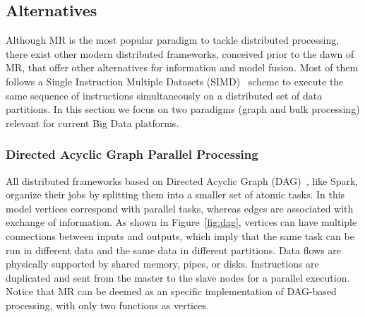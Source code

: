 \documentclass[3p,review]{elsarticle}
\begin{document}


\subsection{Alternatives}\label{subsec:altMR}

Although MR is the most popular paradigm to tackle distributed processing, there exist other modern distributed frameworks, conceived prior to the dawn of MR, that offer other alternatives for information and model fusion. Most of them follows a Single Instruction Multiple Datasets (SIMD)~\cite{sung00} scheme to execute the same sequence of instructions simultaneously on a distributed set of data partitions. In this section we focus on two paradigms (graph and bulk processing) relevant for current Big Data platforms.

\subsubsection{Directed Acyclic Graph Parallel Processing}

All distributed frameworks based on Directed Acyclic Graph (DAG)~\cite{dennis74}, like Spark, organize their jobs by splitting them into a smaller set of atomic tasks. In this model vertices correspond with parallel tasks, whereas edges are associated with exchange of information. As shown in Figure~\ref{fig:dag}, vertices can have multiple connections between inputs and outputs, which imply that the same task can be run in different data and the same data in different partitions. Data flows are physically supported by shared memory, pipes, or disks. Instructions are duplicated and sent from the master to the slave nodes for a parallel execution. Notice that MR can be deemed as an specific implementation of DAG-based processing, with only two functions as vertices. 
\end{document}
